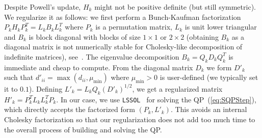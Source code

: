Despite Powell's update, $H_{k}$ might not be positive definite (but still symmetric).
We regularize it as follows: we first perform a Bunch-Kaufman factorization $P_k H_k P_k^T= L_k B_k L_k^T$ where $P_k$ is a permutation matrix, $L_k$ is unit lower triangular and $B_k$ is block diagonal with blocks of size $1 \times 1$ or $2\times 2$ (obtaining $B_k$ as a diagonal matrix is not numerically stable for Cholesky-like decomposition of indefinite matrices), see~\cite{golub:book:1996}.
The eigenvalue decomposition $B_k = Q_k D_k Q_k^T$ is immediate and cheap to compute.
From the diagonal matrix $D_k$ we form $D'_k$ such that $d'_{ii} = \max\left(d_{ii},\mu_{\min}\right)$ where $\mu_{\min}>0$ is user-defined (we typically set it to $0.1$).
Defining $L'_k = L_k Q_k {(D'_k)}^{1/2}$, we get a regularized matrix $H'_k = P_k^T L_k L_k^T P_k$.
In our case, we use {\tt LSSOL}~\cite{gill:techrep:1986} for solving the QP~(\ref{eq:SQPStep}), which directly accepts the factorized form $(P_k, L'_k)$.
This avoids an internal Cholesky factorization so that our regularization does not add too much time to the overall process of building and solving the QP.\@


